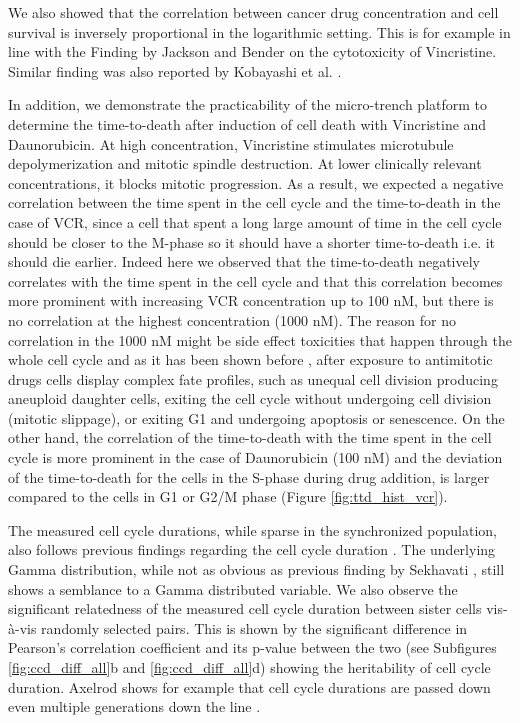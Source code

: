 \documentclass[pdftex,12pt,a4paper]{report}
\begin{document}
We also showed that the correlation between cancer drug concentration and cell survival is inversely proportional in the logarithmic setting. This is for example in line with the Finding by Jackson and Bender \cite{jackson1979cytotoxic} on the cytotoxicity of Vincristine. Similar finding was also reported by Kobayashi et al. \cite{kobayashi1992relationship}.

In addition, we demonstrate the practicability of the micro-trench platform to determine the time-to-death after induction of cell death with Vincristine and Daunorubicin. At high concentration, Vincristine stimulates microtubule depolymerization and mitotic spindle destruction. At lower clinically relevant concentrations, it blocks mitotic progression. As a result, we expected a negative correlation between the time spent in the cell cycle and the time-to-death in the case of VCR, since a cell that spent a long large amount of time in the cell cycle should be closer to the M-phase so it should have a shorter time-to-death i.e. it should die earlier. Indeed here we observed that the time-to-death negatively correlates with the time spent in the cell cycle and that this correlation becomes more prominent with increasing VCR concentration up to 100 nM, but there is no correlation at the highest concentration (1000 nM). The reason for no correlation in the 1000 nM might be side effect toxicities that happen through the whole cell cycle and as it has been shown before \cite{gascoigne2008cancer}, after exposure to antimitotic drugs cells display complex fate profiles, such as unequal cell division producing aneuploid daughter cells, exiting the cell cycle without undergoing cell division (mitotic slippage), or exiting G1 and undergoing apoptosis or senescence. On the other hand, the correlation of the time-to-death with the time spent in the cell cycle is more prominent in the case of Daunorubicin (100 nM) and the deviation of the time-to-death for the cells in the S-phase during drug addition, is larger compared to the cells in G1 or G2/M phase (Figure \ref{fig:ttd_hist_vcr}).

The measured cell cycle durations, while sparse in the synchronized population, also follows previous findings regarding the cell cycle duration \cite{sekhavati2015dynamic}. The underlying Gamma distribution, while not as obvious as previous finding by Sekhavati \cite{sekhavati2015dynamic}, still shows a semblance to a Gamma distributed variable. We also observe the significant relatedness of the measured cell cycle duration between sister cells
vis-\`a-vis randomly selected pairs. This is shown by the significant difference in Pearson's correlation coefficient and its p-value between the two (see Subfigures \ref{fig:ccd_diff_all}b and \ref{fig:ccd_diff_all}d) showing the heritability of cell cycle duration. Axelrod \cite{axelrod1993persistence} shows for example that cell cycle durations are passed down even multiple generations down the line \cite{axelrod1993persistence}.
\end{document}
